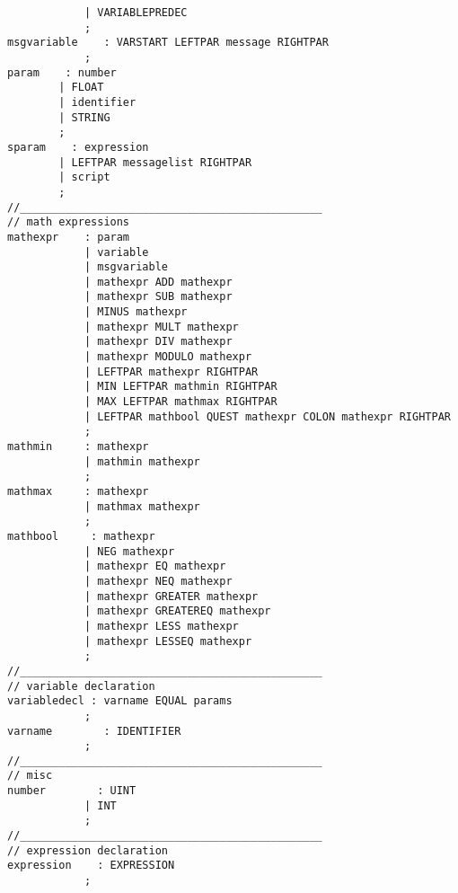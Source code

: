 \begin{verbatim}
            | VARIABLEPREDEC        
            ;
msgvariable    : VARSTART LEFTPAR message RIGHTPAR 
            ;
param    : number                
        | FLOAT                    
        | identifier            
        | STRING                
        ;
sparam    : expression            
        | LEFTPAR messagelist RIGHTPAR    
        | script            
        ;
//_______________________________________________
// math expressions
mathexpr    : param                            
            | variable                        
            | msgvariable                    
            | mathexpr ADD mathexpr            
            | mathexpr SUB mathexpr            
            | MINUS mathexpr                
            | mathexpr MULT mathexpr        
            | mathexpr DIV mathexpr            
            | mathexpr MODULO mathexpr        
            | LEFTPAR mathexpr RIGHTPAR     
            | MIN LEFTPAR mathmin RIGHTPAR    
            | MAX LEFTPAR mathmax RIGHTPAR    
            | LEFTPAR mathbool QUEST mathexpr COLON mathexpr RIGHTPAR 
            ;
mathmin     : mathexpr                        
            | mathmin mathexpr                
            ;
mathmax     : mathexpr                        
            | mathmax mathexpr                
            ;
mathbool     : mathexpr                        
            | NEG mathexpr                    
            | mathexpr EQ mathexpr             
            | mathexpr NEQ mathexpr         
            | mathexpr GREATER mathexpr     
            | mathexpr GREATEREQ mathexpr     
            | mathexpr LESS mathexpr         
            | mathexpr LESSEQ mathexpr         
            ;
//_______________________________________________
// variable declaration
variabledecl : varname EQUAL params    
            ;
varname        : IDENTIFIER            
            ;
//_______________________________________________
// misc
number        : UINT                    
            | INT                    
            ;
//_______________________________________________
// expression declaration
expression    : EXPRESSION    
            ;
\end{verbatim}
